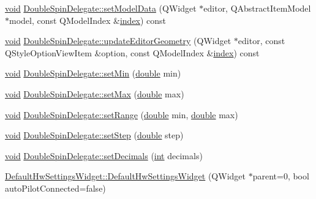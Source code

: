 \begin{DoxyCompactItemize}
\hyperlink{group___u_a_v_objects_plugin_ga444cf2ff3f0ecbe028adce838d373f5c}{void} \hyperlink{group___config_plugin_ga2443d25896b59ae577cfe74ccb2e96c9}{Double\-Spin\-Delegate\-::set\-Model\-Data} (Q\-Widget $\ast$editor, Q\-Abstract\-Item\-Model $\ast$model, const Q\-Model\-Index \&\hyperlink{glext_8h_ab47dd9958bcadea08866b42bf358e95e}{index}) const 
\item 
\hyperlink{group___u_a_v_objects_plugin_ga444cf2ff3f0ecbe028adce838d373f5c}{void} \hyperlink{group___config_plugin_gaa8fa5b648a223ce46e7ede0d8d2374c1}{Double\-Spin\-Delegate\-::update\-Editor\-Geometry} (Q\-Widget $\ast$editor, const Q\-Style\-Option\-View\-Item \&option, const Q\-Model\-Index \&\hyperlink{glext_8h_ab47dd9958bcadea08866b42bf358e95e}{index}) const 
\item 
\hyperlink{group___u_a_v_objects_plugin_ga444cf2ff3f0ecbe028adce838d373f5c}{void} \hyperlink{group___config_plugin_ga8fe1a2276b7d458c30d82f206d31eef8}{Double\-Spin\-Delegate\-::set\-Min} (\hyperlink{_super_l_u_support_8h_a8956b2b9f49bf918deed98379d159ca7}{double} min)
\item 
\hyperlink{group___u_a_v_objects_plugin_ga444cf2ff3f0ecbe028adce838d373f5c}{void} \hyperlink{group___config_plugin_ga0212bd7a414f18e297eef0ab1cbf04ad}{Double\-Spin\-Delegate\-::set\-Max} (\hyperlink{_super_l_u_support_8h_a8956b2b9f49bf918deed98379d159ca7}{double} max)
\item 
\hyperlink{group___u_a_v_objects_plugin_ga444cf2ff3f0ecbe028adce838d373f5c}{void} \hyperlink{group___config_plugin_ga630d5ced68d6c22fa36f9a37cd704d01}{Double\-Spin\-Delegate\-::set\-Range} (\hyperlink{_super_l_u_support_8h_a8956b2b9f49bf918deed98379d159ca7}{double} min, \hyperlink{_super_l_u_support_8h_a8956b2b9f49bf918deed98379d159ca7}{double} max)
\item 
\hyperlink{group___u_a_v_objects_plugin_ga444cf2ff3f0ecbe028adce838d373f5c}{void} \hyperlink{group___config_plugin_ga42edf13270f2e0292e3a4c41d7e3a1ca}{Double\-Spin\-Delegate\-::set\-Step} (\hyperlink{_super_l_u_support_8h_a8956b2b9f49bf918deed98379d159ca7}{double} step)
\item 
\hyperlink{group___u_a_v_objects_plugin_ga444cf2ff3f0ecbe028adce838d373f5c}{void} \hyperlink{group___config_plugin_ga11e87a1f2a87beb99eff9abd3ed39c70}{Double\-Spin\-Delegate\-::set\-Decimals} (\hyperlink{ioapi_8h_a787fa3cf048117ba7123753c1e74fcd6}{int} decimals)
\item 
\hyperlink{group___config_plugin_ga70b182d3a503dd16f8ac5c389306bc50}{Default\-Hw\-Settings\-Widget\-::\-Default\-Hw\-Settings\-Widget} (Q\-Widget $\ast$parent=0, bool auto\-Pilot\-Connected=false)

\end{DoxyCompactItemize}

